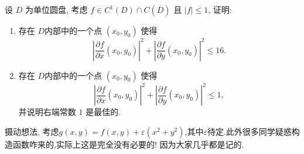 \documentclass[../../main.tex]{subfiles}%
\begin{document}
\begin{example}
设 \( D \) 为单位圆盘, 考虑 \( f \in C^1(D) \cap C(\overline{D}) \) 且 \( |f| \leqslant 1 \), 证明: 
\begin{enumerate}[(1)]
\item 存在 \( D \)内部中的一个点 \( (x_0, y_0) \) 使得
\[
\left| \frac{\partial f}{\partial x}(x_0, y_0) \right|^2 + \left| \frac{\partial f}{\partial y}(x_0, y_0) \right|^2 \leqslant 16 .
\]

\item 存在 \( D \)内部中的一个点 \( (x_0, y_0) \) 使得\[
\left| \frac{\partial f}{\partial x}(x_0, y_0) \right|^2 + \left| \frac{\partial f}{\partial y}(x_0, y_0) \right|^2 \leqslant 1,
\]
并说明右端常数 \(1\) 是最佳的.
\end{enumerate}
\end{example}
\begin{note}
摄动想法, 考虑$g(x,y)=f(x,y)+\varepsilon (x^2+y^2)$,其中$\varepsilon$待定.此外很多同学疑惑构造函数咋来的,实际上这是完全没有必要的! 因为大家几乎都是记的.
\end{note}
\end{document}
